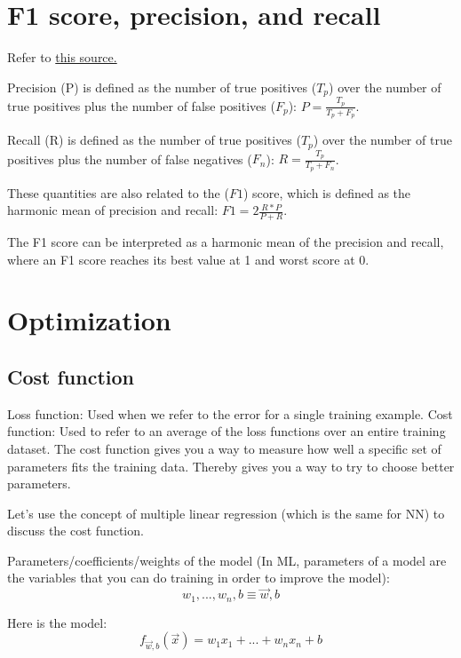 \documentclass[12pt]{report}
\begin{document}
\section{F1 score, precision, and recall}
Refer to \href{https://scikit-learn.org/stable/auto_examples/model_selection/plot_precision_recall.html#precision-recall}{this source.}

Precision (P) is defined as the number of true positives ($T_p$) over the number of true positives plus the number of false positives ($F_p$):
$P = \frac{T_p}{T_p + F_p} $.

Recall    (R) is defined as the number of true positives ($T_p$) over the number of true positives plus the number of false negatives ($F_n$):
$R = \frac{T_p}{T_p + F_n} $.

These quantities are also related to the ($F1$) score, which is defined as the harmonic mean of precision and recall:
$F1 = 2 \frac{R * P}{ P + R } $.

The F1 score can be interpreted as a harmonic mean of the precision and recall, where an F1 score reaches its best value at 1 and worst score at 0.

\section{Optimization}

\subsection{Cost function}
\label{sec:cost}
Loss function: Used when we refer to the error for a single training example. Cost function: Used to refer to an average of the loss functions over an entire training dataset.
The cost function gives you a way to measure how well a specific set of parameters fits the training data. Thereby gives you a way to try to choose better parameters.

Let's use the concept of multiple linear regression (which is the same for NN) to discuss the cost function.

Parameters/coefficients/weights of the model (In ML, parameters of a model are the variables that you can do training in order to improve the model):
\begin{equation}
  w_1, . . . , w_n , b \equiv \overrightarrow{w} ,b
\end{equation}

Here is the model:
\begin{equation}
	f_{\overrightarrow{w},b} (\overrightarrow{x}) = w_1x_1 +  ... + w_nx_n + b
\end{equation}
\end{document}

